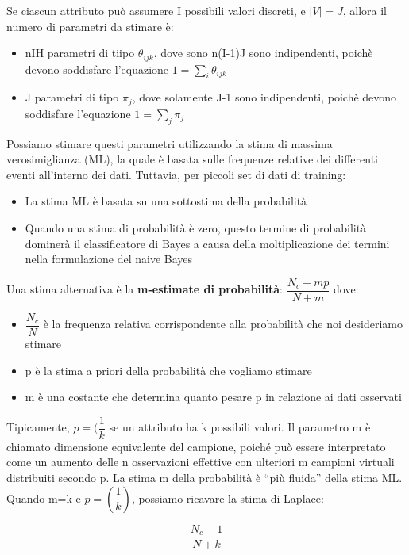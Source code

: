 \documentclass[a4paper]{extarticle}
\begin{document}
Se ciascun attributo può assumere I possibili valori discreti, e $|V| = J$, allora il numero di parametri da stimare è:

\begin{itemize}
\item nIH parametri di tiipo $\theta_{ijk}$, dove sono n(I-1)J sono indipendenti, poichè devono soddisfare l'equazione $1=\sum\limits_i \theta_{ijk}$
\item J parametri di tipo $\pi_j $, dove solamente J-1 sono indipendenti, poichè devono soddisfare l'equazione $1=\sum\limits_j \pi_j $
\end{itemize}

Possiamo stimare questi parametri utilizzando la stima di massima verosimiglianza (ML), la quale è basata sulle frequenze relative dei differenti eventi all'interno dei dati. Tuttavia, per piccoli set di dati di training:

\begin{itemize}
\item La stima ML è basata su una sottostima della probabilità
\item Quando una stima di probabilità è zero, questo termine di probabilità dominerà il classificatore di Bayes a causa della moltiplicazione dei termini nella formulazione del naive Bayes
\end{itemize}

Una stima alternativa è la \textbf{m-estimate di probabilità}: $\dfrac{N_c + mp}{N+m}$ dove:

\begin{itemize}
\item $\dfrac{N_c}{N}$ è la frequenza relativa corrispondente alla probabilità che noi desideriamo stimare
\item p è la stima a priori della probabilità che vogliamo stimare
\item m è una costante che determina quanto pesare p in relazione ai dati osservati
\end{itemize}

Tipicamente, $p=(\dfrac{1}{k}$ se un attributo ha k possibili valori. Il parametro m è chiamato dimensione equivalente del campione, poiché può essere interpretato come un aumento delle n osservazioni effettive con ulteriori m campioni virtuali distribuiti secondo p. La stima m della probabilità è “più fluida” della stima ML. Quando m=k e $p=(\dfrac{1}{k})$, possiamo ricavare la stima di Laplace:

\begin{equation*}
\dfrac{N_c+1}{N+k}
\end{equation*}
\end{document}

